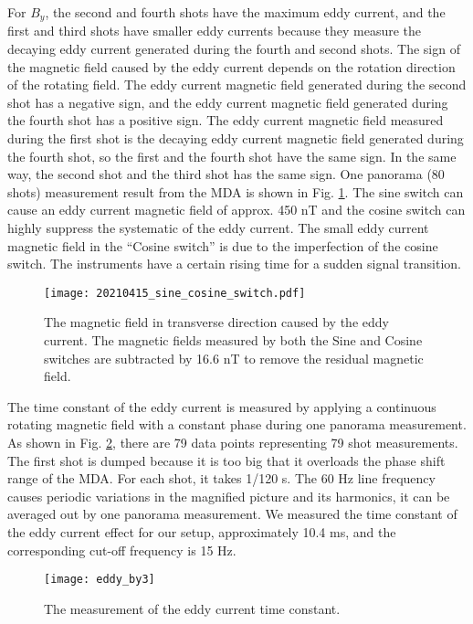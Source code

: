 \documentclass[prx,twocolumn,10pt,nofootinbib]{revtex4-1}
\begin{document}
For $B_y$, the second and fourth shots have the maximum eddy current, and the first and third shots have smaller eddy currents because they measure the decaying eddy current generated during the fourth and second shots. The sign of the magnetic field caused by the eddy current depends on the rotation direction of the rotating field. The eddy current magnetic field generated during the second shot has a negative sign, and the eddy current magnetic field generated during the fourth shot has a positive sign. The eddy current magnetic field measured during the first shot is the decaying eddy current magnetic field generated during the fourth shot, so the first and the fourth shot have the same sign. In the same way, the second shot and the third shot has the same sign.  One panorama (80 shots) measurement result from the MDA is shown in Fig. \ref{fig:sine_cosine_switch}. The sine switch can cause an eddy current magnetic field of approx. 450 nT and the cosine switch can highly suppress the systematic of the eddy current. The small eddy current magnetic field in the ``Cosine switch'' is due to the imperfection of the cosine switch. The instruments have a certain rising time for a sudden signal transition.

\begin{figure}
\centering
\texttt{[image: 20210415\_sine\_cosine\_switch.pdf]}
\caption{The magnetic field in transverse direction caused by the eddy current. The magnetic fields measured by both the Sine and Cosine switches are subtracted by 16.6 nT to remove the residual magnetic field. }
\label{fig:sine_cosine_switch}	
\end{figure}

The time constant of the eddy current is measured by applying a continuous rotating magnetic field with a constant phase during one panorama measurement.  As shown in Fig. \ref{fig:eddy_time_constant}, there are 79 data points representing 79 shot measurements. The first shot is dumped because it is too big that it overloads the phase shift range of the MDA. For each shot, it takes 1/120 s. The 60 Hz line frequency causes periodic variations in the magnified picture and its harmonics, it can be averaged out by one panorama measurement. We measured the time constant of the eddy current effect for our setup, approximately 10.4 ms, and the corresponding cut-off frequency is 15 Hz.

\begin{figure}
\centering
	\texttt{[image: eddy\_by3]}
	\caption{The measurement of the eddy current time constant.}
	\label{fig:eddy_time_constant}
\end{figure}
\end{document}
